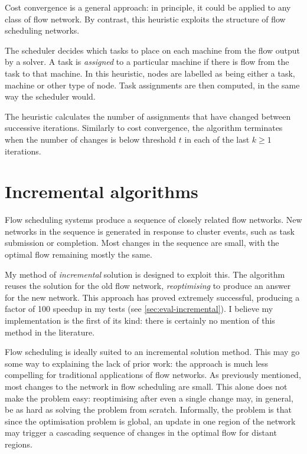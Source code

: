 Cost convergence is a general approach: in principle, it could be applied to any class of flow network. By contrast, this heuristic exploits the structure of flow scheduling networks.

The scheduler decides which tasks to place on each machine from the flow output by a solver. A task is \emph{assigned} to a particular machine if there is flow from the task to that machine. In this heuristic, nodes are labelled as being either a task, machine or other type of node. Task assignments are then computed, in the same way the scheduler would.

The heuristic calculates the number of assignments that have changed between successive iterations. Similarly to cost convergence, the algorithm terminates when the number of changes is below threshold $t$ in each of the last $k \geq 1$ iterations.


\section{Incremental algorithms} \label{sec:impl-incremental}

Flow scheduling systems produce a sequence of closely related flow networks. New networks in the sequence is generated in response to cluster events, such as task submission or completion. Most changes in the sequence are small, with the optimal flow remaining mostly the same.

My method of \emph{incremental} solution is designed to exploit this. The algorithm reuses the solution for the old flow network, \emph{reoptimising} to produce an answer for the new network. This approach has proved extremely successful, producing a factor of 100 speedup in my tests (see \cref{sec:eval-incremental}). I believe my implementation is the first of its kind: there is certainly no mention of this method in the literature.

Flow scheduling is ideally suited to an incremental solution method. This may go some way to explaining the lack of prior work: the approach is much less compelling for traditional applications of flow networks. As previously mentioned, most changes to the network in flow scheduling are small. This alone does not make the problem easy: reoptimising after even a single change may, in general, be as hard as solving the problem from scratch\footnotemark. Informally, the problem is that since the optimisation problem is global, an update in one region of the network may trigger a cascading sequence of changes in the optimal flow for distant regions.

